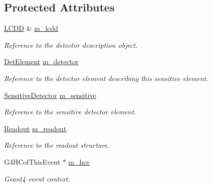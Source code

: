 \subsection*{Protected Attributes}
\begin{DoxyCompactItemize}
\item 
\hyperlink{class_d_d4hep_1_1_geometry_1_1_l_c_d_d}{LCDD} \& \hyperlink{class_d_d4hep_1_1_simulation_1_1_geant4_sensitive_detector_af2c638cb0b0a50437852cf6fb57ef7f1}{m\_\-lcdd}
\begin{DoxyCompactList}\small\item\em Reference to the detector description object. \item\end{DoxyCompactList}\item 
\hyperlink{class_d_d4hep_1_1_geometry_1_1_det_element}{DetElement} \hyperlink{class_d_d4hep_1_1_simulation_1_1_geant4_sensitive_detector_a0483eb9c4a7e8d31c499239867b53ff1}{m\_\-detector}
\begin{DoxyCompactList}\small\item\em Reference to the detector element describing this sensitive element. \item\end{DoxyCompactList}\item 
\hyperlink{class_d_d4hep_1_1_geometry_1_1_sensitive_detector}{SensitiveDetector} \hyperlink{class_d_d4hep_1_1_simulation_1_1_geant4_sensitive_detector_a6292e7640bd34206cb682962570a6721}{m\_\-sensitive}
\begin{DoxyCompactList}\small\item\em Reference to the sensitive detector element. \item\end{DoxyCompactList}\item 
\hyperlink{class_d_d4hep_1_1_geometry_1_1_readout}{Readout} \hyperlink{class_d_d4hep_1_1_simulation_1_1_geant4_sensitive_detector_a896a6c6cb7ea1a05384a0a36516da34f}{m\_\-readout}
\begin{DoxyCompactList}\small\item\em Reference to the readout structure. \item\end{DoxyCompactList}\item 
G4HCofThisEvent $\ast$ \hyperlink{class_d_d4hep_1_1_simulation_1_1_geant4_sensitive_detector_abba73e5c3e4dfb26cc46bb5c165cf225}{m\_\-hce}
\begin{DoxyCompactList}\small\item\em Geant4 event context. \item\end{DoxyCompactList}\end{DoxyCompactItemize}


